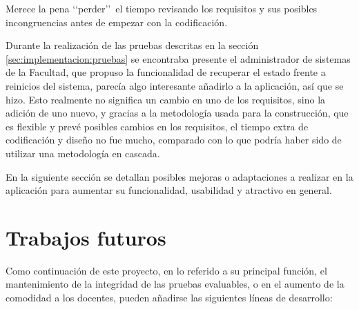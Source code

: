 Merece la pena \lq\lq perder\rq\rq \ el tiempo revisando los requisitos y sus posibles incongruencias antes de empezar con la codificación.
\newline


Durante la realización de las pruebas descritas en la sección \ref{sec:implementacion:pruebas} se encontraba presente el administrador de sistemas de la Facultad, que propuso la funcionalidad de recuperar el estado frente a reinicios del sistema, parecía algo interesante añadirlo a la aplicación, así que se hizo. Esto realmente no significa un cambio en uno de los requisitos, sino la adición de uno nuevo, y gracias a la metodología usada para la construcción, que es flexible y prevé posibles cambios en los requisitos, el tiempo extra de codificación y diseño no fue mucho, comparado con lo que podría haber sido de utilizar una metodología en cascada.
\newline

En la siguiente sección se detallan posibles mejoras o adaptaciones a realizar en la aplicación para aumentar su funcionalidad, usabilidad y atractivo en general.

\section{Trabajos futuros}
\label{sec:futuro:futuro}

Como continuación de este proyecto, en lo referido a su principal función, el mantenimiento de la integridad de las pruebas evaluables, o en el aumento de la comodidad a los docentes, pueden añadirse las siguientes líneas de desarrollo:

